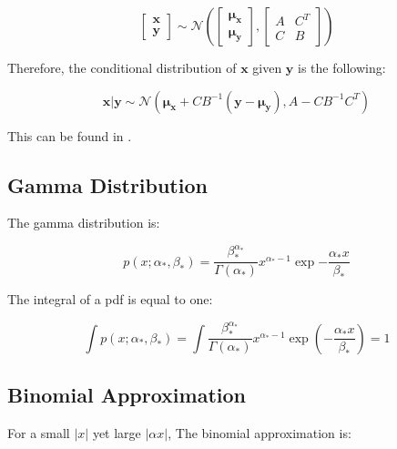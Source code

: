 \documentclass[12pt,a4paper]{article}
\begin{document}
\begin{equation*}
\begin{bmatrix}
\mathbf{x} \\
\mathbf{y}
\end{bmatrix}
\sim \mathcal{N}\left( 
\begin{bmatrix}
\boldsymbol{\mu}_\mathbf{x} \\
\boldsymbol{\mu}_\mathbf{y}
\end{bmatrix},
\begin{bmatrix}
A & C^T \\
C & B
\end{bmatrix}
\right)
\end{equation*}

Therefore, the conditional distribution of \(\mathbf{x}\) given \(\mathbf{y}\) is the following:

\begin{equation}
\mathbf{x} | \mathbf{y} \sim \mathcal{N}(\boldsymbol{\mu}_\mathbf{x} + C B^{-1}(\mathbf{y} - \boldsymbol{\mu}_\mathbf{y}), A - C B^{-1} C^T)
\label{eq:conditional distribution}
\end{equation}

This can be found in \citet[see~section 9.3]{von1967mathematical}.

\subsection{Gamma Distribution}
The gamma distribution is:

\begin{equation}
p(x; \alpha_*, \beta_*) = \frac{\beta_{*}^{\alpha_*}}{\Gamma(\alpha_*)} x^{\alpha_{*} - 1} \exp{-\frac{\alpha_*x}{\beta_*}}
\label{eq:gamma distribution}
\end{equation}

The integral of a pdf is equal to one:

\begin{equation}
\int p(x; \alpha_*, \beta_*) = \int \frac{\beta_{*}^{\alpha_*}}{\Gamma(\alpha_*)} x^{\alpha_{*} - 1} \exp(-\frac{\alpha_*x}{\beta_*}) = 1
\label{eq:gamma integral}
\end{equation}

\subsection{Binomial Approximation}

For a small \(|x|\) yet large \(|\alpha x|\), The binomial approximation is:
\end{document}

